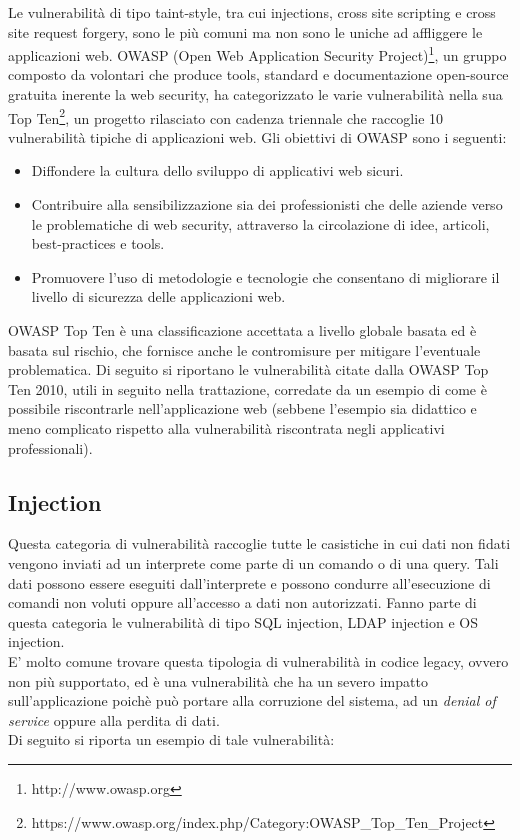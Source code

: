 Le vulnerabilità di tipo taint-style, tra cui injections, cross site scripting e cross site request forgery, sono le più comuni ma non sono le uniche ad affliggere le applicazioni web.
OWASP (Open Web Application Security Project)\footnote{http://www.owasp.org}, un gruppo composto da volontari che produce tools, standard e documentazione open-source gratuita inerente la web security, ha categorizzato le varie vulnerabilità nella sua Top Ten\footnote{https://www.owasp.org/index.php/Category:OWASP\_Top\_Ten\_Project}, un progetto rilasciato con cadenza triennale che raccoglie 10 vulnerabilità tipiche di applicazioni web. 
Gli obiettivi di OWASP sono i seguenti:
\begin{itemize}
\item Diffondere la cultura dello sviluppo di applicativi web sicuri.
\item Contribuire alla sensibilizzazione sia dei professionisti che delle aziende verso le problematiche di web security, attraverso la circolazione di idee, articoli, best-practices e tools.
\item Promuovere l’uso di metodologie e tecnologie che consentano di migliorare il livello di sicurezza delle applicazioni web.
\end{itemize}
OWASP Top Ten è una classificazione accettata a livello globale basata ed è basata sul rischio, che fornisce anche le contromisure per mitigare l'eventuale problematica. Di seguito si riportano le vulnerabilità citate dalla OWASP Top Ten 2010, utili in seguito nella trattazione, corredate da un esempio di come è possibile riscontrarle nell'applicazione web (sebbene l'esempio sia didattico e meno complicato rispetto alla vulnerabilità riscontrata negli applicativi professionali).

\subsection{Injection}
Questa categoria di vulnerabilità raccoglie tutte le casistiche in cui dati non fidati vengono inviati ad un interprete come parte di un comando o di una query. Tali dati possono essere eseguiti dall'interprete e possono condurre all'esecuzione di comandi non voluti oppure all'accesso a dati non autorizzati. Fanno parte di questa categoria le vulnerabilità di tipo SQL injection, LDAP injection e OS injection.\\
E' molto comune trovare questa tipologia di vulnerabilità in codice legacy, ovvero non più supportato, ed è una vulnerabilità che ha un severo impatto sull'applicazione poichè può portare alla corruzione del sistema, ad un \emph{denial of service} oppure alla perdita di dati.\\
Di seguito si riporta un esempio di tale vulnerabilità:\\

